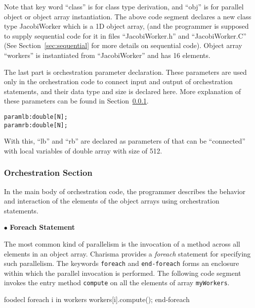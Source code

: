 \documentclass[10pt]{article}
\def\smallfbox#1{{\small \fbox{#1}}}
\def\code#1{{\small {\tt {#1}}}}
\begin{document}
Note that key word ``class'' is for class type derivation, and ``obj'' is for
parallel object or object array instantiation. The above code segment declares a
new class type JacobiWorker which is a 1D object array, (and the programmer is
supposed to supply sequential code for it in files ``JacobiWorker.h'' and
``JacobiWorker.C'' (See Section~\ref{sec:sequential} for more details on
sequential code). Object array ``workers'' is instantiated from ``JacobiWorker''
and has 16 elements.

The last part is orchestration parameter declaration. These parameters are used
only in the orchestration code to connect input and output of orchestration
statements, and their data type and size is declared here. More explanation of
these parameters can be found in Section~\ref{sec:orchsec}. 

\begin{alltt}
    param lb : double[N];
    param rb : double[N];
\end{alltt}

With this, ``lb'' and ``rb'' are declared as parameters of that can be 
``connected'' with local variables of double array with size of 512. 

\subsubsection{Orchestration Section}
\label{sec:orchsec}

In the main body of orchestration code, the programmer describes the behavior
and interaction of the elements of the object arrays using orchestration
statements.

$\bullet$ {\bf Foreach Statement}

The most common kind of parallelism is the invocation of a method
across all elements in an object array. Charisma provides a {\em foreach}
statement for specifying such parallelism. The keywords \code{foreach} and
\code{end-foreach} forms an enclosure within which the parallel invocation is
performed. The following code segment invokes the entry method \code{compute} on
all the elements of array \code{myWorkers}. 

\begin{SaveVerbatim}{foodecl}
  foreach i in workers
    workers[i].compute();
  end-foreach
\end{SaveVerbatim}
\vspace{0.1in}
\smallfbox{\BUseVerbatim{foodecl}}
\vspace{0.1in}
\end{document}
